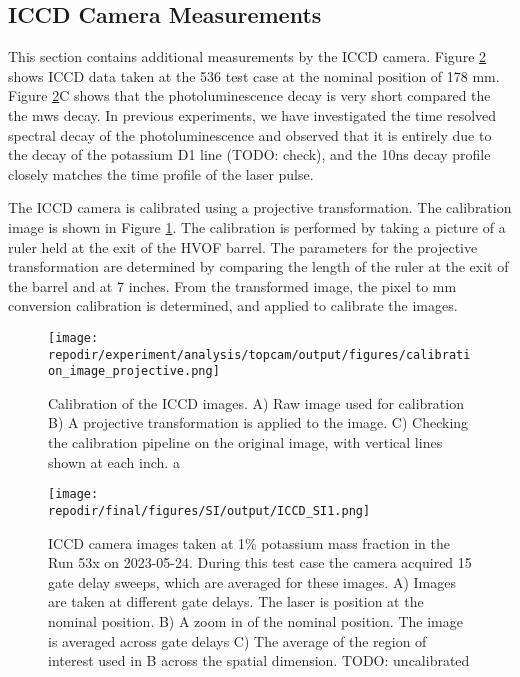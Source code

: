 \clearpage
\subsection{ICCD Camera Measurements}

This section contains additional measurements by the ICCD camera. Figure \ref{fig:SI_536_iccd} shows ICCD data taken at the 536 test case at the nominal position of 178 mm. Figure \ref{fig:SI_536_iccd}C shows that the photoluminescence decay is very short compared the the mws decay. In previous experiments, we have investigated the time resolved spectral decay of the photoluminescence and observed that it is entirely due to the decay of the potassium D1 line (TODO: check), and the 10ns decay profile closely matches the time profile of the laser pulse. 

The ICCD camera is calibrated using a projective transformation. The calibration image is shown in Figure \ref{fig:SI_iccd_calibration}. The calibration is performed by taking a picture of a ruler held at the exit of the HVOF barrel. The parameters for the projective transformation are determined by comparing the length of the ruler at the exit of the barrel and at 7 inches. From the transformed image, the pixel to mm conversion calibration is determined, and applied to calibrate the images. 

\begin{figure}[]
\centering
\texttt{[image: \\repodir/experiment/analysis/topcam/output/figures/calibration\_image\_projective.png]}
\caption{Calibration of the ICCD images. A) Raw image used for calibration B) A projective transformation is applied to the image. C) Checking the calibration pipeline on the original image, with vertical lines shown at each inch. a}
\label{fig:SI_iccd_calibration}
\end{figure}


\begin{figure}[]
\centering
\texttt{[image: \\repodir/final/figures/SI/output/ICCD\_SI1.png]}
\caption{ICCD camera images taken at 1\% potassium mass fraction in the Run 53x on 2023-05-24. During this test case the camera acquired 15 gate delay sweeps, which are averaged for these images. A) Images are taken at different gate delays. The laser is position at the nominal position. B) A zoom in of the nominal position. The image is averaged across gate delays C) The average of the region of interest used in B across the spatial dimension. TODO: uncalibrated}
\label{fig:SI_536_iccd}
\end{figure}



